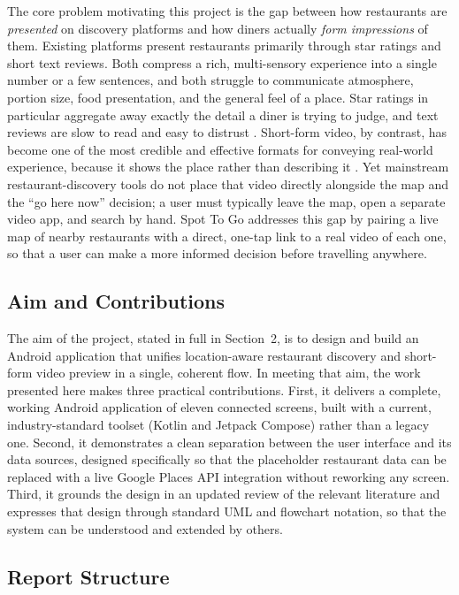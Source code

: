 \documentclass[12pt, a4paper]{article}
\begin{document}
The core problem motivating this project is the gap between how restaurants are \emph{presented} on discovery platforms and how diners actually \emph{form impressions} of them. Existing platforms present restaurants primarily through star ratings and short text reviews. Both compress a rich, multi-sensory experience into a single number or a few sentences, and both struggle to communicate atmosphere, portion size, food presentation, and the general feel of a place. Star ratings in particular aggregate away exactly the detail a diner is trying to judge, and text reviews are slow to read and easy to distrust \citep{dellarocas2003, cheung2009}. Short-form video, by contrast, has become one of the most credible and effective formats for conveying real-world experience, because it shows the place rather than describing it \citep{kaplan2010, montag2021}. Yet mainstream restaurant-discovery tools do not place that video directly alongside the map and the ``go here now'' decision; a user must typically leave the map, open a separate video app, and search by hand. Spot To Go addresses this gap by pairing a live map of nearby restaurants with a direct, one-tap link to a real video of each one, so that a user can make a more informed decision before travelling anywhere.

\subsection{Aim and Contributions}

The aim of the project, stated in full in Section~2, is to design and build an Android application that unifies location-aware restaurant discovery and short-form video preview in a single, coherent flow. In meeting that aim, the work presented here makes three practical contributions. First, it delivers a complete, working Android application of eleven connected screens, built with a current, industry-standard toolset (Kotlin and Jetpack Compose) rather than a legacy one. Second, it demonstrates a clean separation between the user interface and its data sources, designed specifically so that the placeholder restaurant data can be replaced with a live Google Places API integration without reworking any screen. Third, it grounds the design in an updated review of the relevant literature and expresses that design through standard UML and flowchart notation, so that the system can be understood and extended by others.

\subsection{Report Structure}
\end{document}
